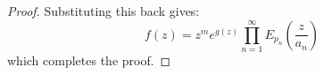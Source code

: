 \documentclass[a4paper]{article}
\begin{document}
\begin{theorem}
\begin{proof}
Substituting this back gives:
\begin{equation*}
f(z) = z^m e^{g(z)} \prod_{n=1}^{\infty} E_{p_n}\left( \frac{z}{a_n} \right)
\end{equation*}
which completes the proof.
\end{proof}
\end{theorem}
\end{document}
